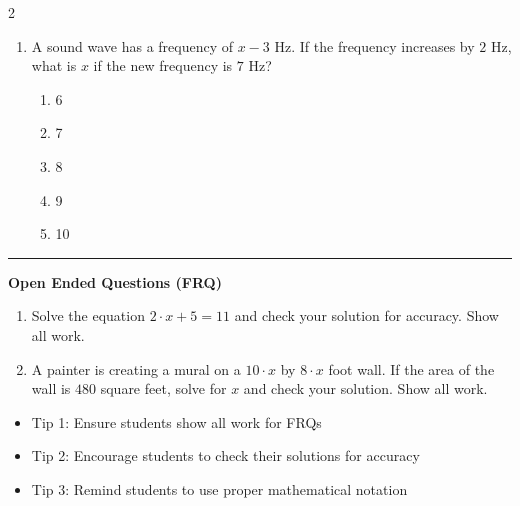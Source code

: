 \documentclass[10pt]{article}
\begin{document}
\begin{multicols}{2}
\begin{enumerate}[label=\textbf{Q\arabic*.}, leftmargin=*, itemsep=6pt, parsep=0pt]
  \item \small A sound wave has a frequency of $x - 3$ Hz. If the frequency increases by $2$ Hz, what is $x$ if the new frequency is $7$ Hz?
  \begin{enumerate}[label=(\Alph*), leftmargin=0.6cm, nosep, itemsep=2pt]
    \item 6
    \item 7
    \item 8
    \item 9
    \item 10
  \end{enumerate}

\end{enumerate}
\end{multicols}

\vspace{-0.2cm}
\hrule
\vspace{0.2cm}
\textbf{\small Open Ended Questions (FRQ)}
\begin{enumerate}[label=\textbf{Q\arabic*.}, start=9, itemsep=5pt, topsep=0pt]

  \item \small Solve the equation $2 \cdot x + 5 = 11$ and check your solution for accuracy. Show all work. \vspace{2cm}

  \item \small A painter is creating a mural on a $10 \cdot x$ by $8 \cdot x$ foot wall. If the area of the wall is $480$ square feet, solve for $x$ and check your solution. Show all work. \vspace{2cm}

\end{enumerate}

\vfill

\begin{tcolorbox}[colback=blue!5, colframe=mainblue!50, title=\small \textbf{Chef's Tips}, fonttitle=\bfseries, bottom=1mm]
\begin{itemize}[noitemsep, topsep=2pt, leftmargin=0.5cm]
  \item \scriptsize Tip 1: Ensure students show all work for FRQs\item \scriptsize Tip 2: Encourage students to check their solutions for accuracy\item \scriptsize Tip 3: Remind students to use proper mathematical notation
\end{itemize}
\end{tcolorbox}
\end{document}
